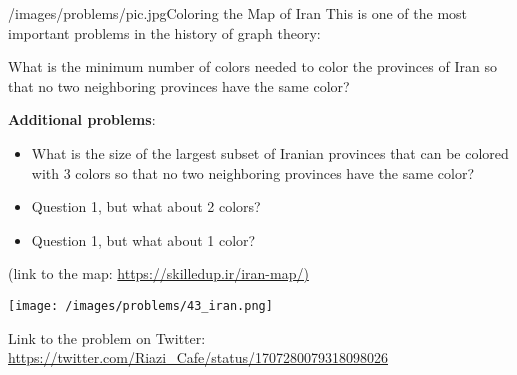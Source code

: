 \begin{problem}{/images/problems/pic.jpg}{Coloring the Map of Iran}
	This is one of the most important problems in the history of graph theory:
	
What is the minimum number of colors needed to color the provinces of Iran so that no two neighboring provinces have the same color?

\textbf{Additional problems}:
\begin{itemize}
\item What is the size of the largest subset of Iranian provinces that can be colored with 3 colors so that no two neighboring provinces have the same color?
\item Question 1, but what about 2 colors?
\item Question 1, but what about 1 color?
\end{itemize}
(link to the map:  \url{https://skilledup.ir/iran-map/)}

\begin{center}
	\texttt{[image: /images/problems/43\_iran.png]}
\end{center}

 Link to the problem on Twitter: \url{https://twitter.com/Riazi_Cafe/status/1707280079318098026}
\end{problem}
